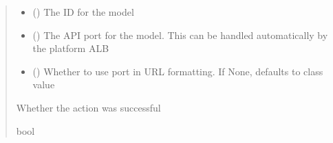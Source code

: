 \documentclass[letterpaper,10pt,english]{sphinxmanual}
\begin{document}
\begin{fulllineitems}
\begin{fulllineitems}
\begin{sphinxVerbatim}[commandchars=\\\{\}]
 
  
\end{sphinxVerbatim}
\begin{quote}\begin{description}
\begin{itemize}
\item {} 
\sphinxAtStartPar
{} () \textendash{} The ID for the model

\item {} 
\sphinxAtStartPar
{} (\sphinxstyleliteralemphasis{\sphinxupquote{ (}}\sphinxstyleliteralemphasis{\sphinxupquote{)}}) \textendash{} The API port for the model. This can be handled automatically by the platform ALB

\item {} 
\sphinxAtStartPar
{} (\sphinxstyleliteralemphasis{\sphinxupquote{ (}}\sphinxstyleliteralemphasis{\sphinxupquote{)}}) \textendash{} Whether to use port in URL formatting. If None, defaults to class value

\end{itemize}

\sphinxAtStartPar
{} \textendash{} Whether the action was successful

\sphinxAtStartPar
bool

\end{description}\end{quote}

\end{fulllineitems}


\end{fulllineitems}
\end{document}
